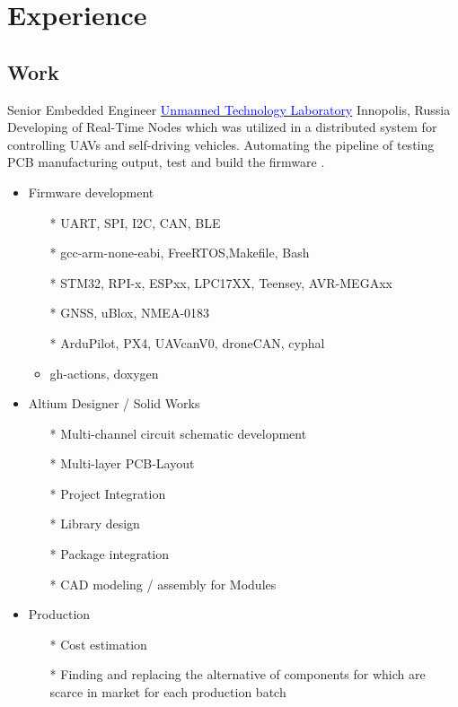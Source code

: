 \section{Experience}

\vspace{2mm}
\subsection{\Large{Work}}

        {Senior Embedded Engineer}
        {\href{https://robotics.innopolis.university/en/labs/laboratoriya-bespilotnyh-technologyi/}{\textcolor{blue}{Unmanned Technology Laboratory}}}
        {Innopolis, Russia}
        {
        \newline
        Developing of Real-Time Nodes which was utilized in a distributed system for controlling UAVs and self-driving vehicles. Automating the pipeline of testing PCB manufacturing output, test and build the firmware .
        } 
        {
        \begin{itemize}
            \item Firmware development
            \begin{itemize}
                \item[*] UART, SPI, I2C, CAN, BLE
                \item[*] gcc-arm-none-eabi, FreeRTOS,Makefile, Bash
                \item[*] STM32, RPI-x, ESPxx, LPC17XX, Teensey, AVR-MEGAxx 
                \item[*] GNSS, uBlox, NMEA-0183
                \item[*] ArduPilot, PX4, UAVcanV0, droneCAN, cyphal
                \item gh-actions, doxygen
            \end{itemize}
            \item Altium Designer / Solid Works \begin{itemize}
                \item[*] Multi-channel circuit schematic development
                \item[*] Multi-layer PCB-Layout
                \item[*] Project Integration
                \item[*] Library design
                \item[*] Package integration
                \item[*] CAD modeling / assembly for Modules
            \end{itemize}
            \item Production 
            \begin{itemize}
            \item[*] Cost estimation 
            \item[*] Finding and replacing the alternative of components for which are scarce in market for each production batch
            \end{itemize} 
        \end{itemize}
        }
